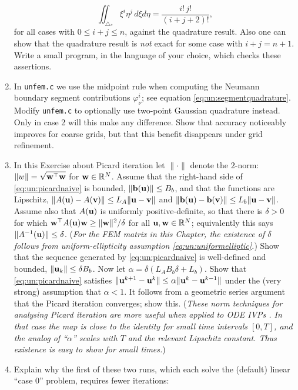 \begin{enumerate}
\begin{equation}
\iint_{\triangle_\ast} \xi^i \eta^j\,d\xi d\eta = \frac{i!\,j!}{(i+j+2)!}, \label{eq:un:checkquadrature}
\end{equation}
for all cases with $0\le i+j\le n$, against the quadrature result.  Also one can show that the quadrature result is \emph{not} exact for some case with $i+j=n+1$.  Write a small program, in the language of your choice, which checks these assertions.
\item \label{exer:un:gaussneumann}  In \texttt{unfem.c} we use the midpoint rule when computing the Neumann boundary segment contributions $\varphi_\nu^i$; see equation \eqref{eq:un:segmentquadrature}.  Modify \texttt{unfem.c} to optionally use two-point Gaussian quadrature instead.  Only in case 2 will this make any difference.  Show that accuracy noticeably improves for coarse grids, but that this benefit disappears under grid refinement.
\item \label{exer:un:picardconvergence}  In this Exercise about Picard iteration let $\|\cdot\|$ denote the $2$-norm: $\|w\| = \sqrt{\mathbf{w}^\top \mathbf{w}}$ for $\mathbf{w}\in\mathbb{R}^N$.  Assume that the right-hand side of \eqref{eq:un:picardnaive} is bounded, $\|\mathbf{b}(\mathbf{u})\| \le B_b$, and that the functions are Lipschitz, $\|A(\mathbf{u})-A(\mathbf{v})\| \le L_A \|\mathbf{u}-\mathbf{v}\|$ and $\|\mathbf{b}(\mathbf{u})-\mathbf{b}(\mathbf{v})\| \le L_b \|\mathbf{u}-\mathbf{v}\|$.  Assume also that $A(\mathbf{u})$ is uniformly positive-definite, so that there is $\delta>0$ for which $\mathbf{w}^\top A(\mathbf{u}) \mathbf{w} \ge \|\mathbf{w}\|^2/\delta$ for all $\mathbf{u}, \mathbf{w} \in \mathbb{R}^N$; equivalently this says $\|A^{-1}(\mathbf{u})\| \le \delta$.  (\emph{For the FEM matrix in this Chapter, the existence of $\delta$ follows from uniform-ellipticity assumption \eqref{eq:un:uniformelliptic}.})  Show that the sequence generated by \eqref{eq:un:picardnaive} is well-defined and bounded, $\|\mathbf{u}_k\| \le \delta B_b$.  Now let $\alpha = \delta \left(L_A B_b \delta + L_b\right)$.  Show that \eqref{eq:un:picardnaive} satisfies $\|\mathbf{u}^{k+1}-\mathbf{u}^{k}\| \le \alpha \|\mathbf{u}^{k}-\mathbf{u}^{k-1}\|$ under the (very strong) assumption that $\alpha < 1$.  It follows from a geometric series argument that the Picard iteration converges; show this.  (\emph{These norm techniques for analysing Picard iteration are more useful when applied to ODE IVPs \citep{HirschSmaleDevaney2004}.  In that case the map is close to the identity for small time intervals $[0,T]$, and the analog of ``$\alpha$'' scales with $T$ and the relevant Lipschitz constant.  Thus existence is easy to show for small times.})
\item Explain why the first of these two runs, which each solve the (default) linear ``case $0$'' problem, requires fewer \pSNES iterations:

\end{enumerate}
